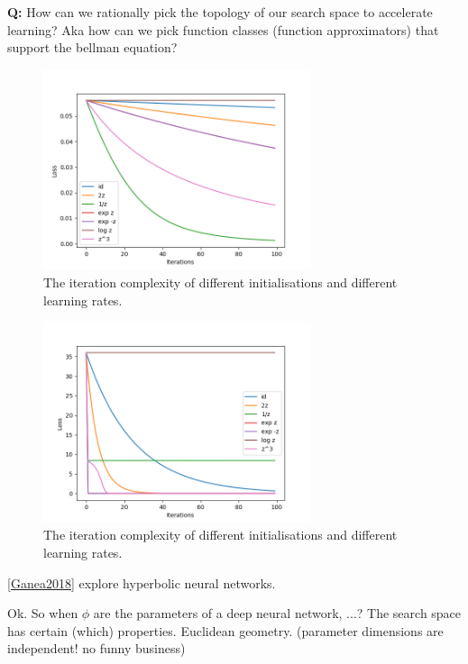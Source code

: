 \textbf{Q:} How can we rationally pick the topology of our search space
to accelerate learning?
Aka how can we pick function classes (function approximators) that support the bellman equation?

\begin{figure}
\centering
\includegraphics[width=0.7\textwidth,height=0.35\textheight]{../../pictures/figures/reparam-ce-04.png}
\caption{The iteration complexity of different initialisations and different learning rates.}
\end{figure}

\begin{figure}
\centering
\includegraphics[width=0.7\textwidth,height=0.35\textheight]{../../pictures/figures/reparam-mse-04.png}
\caption{The iteration complexity of different initialisations and different learning rates.}
\end{figure}

\ref{Ganea2018} explore hyperbolic neural networks.

Ok. So when $\phi$ are the parameters of a deep neural network, ...? The search space has certain (which) properties.
Euclidean geometry.
(parameter dimensions are independent! no funny business)

